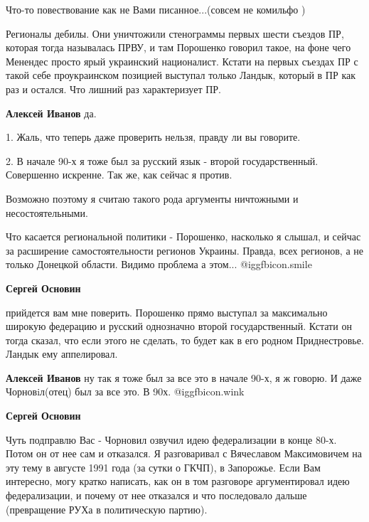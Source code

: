 \begin{itemize}
Что-то повествование как не Вами писанное...(совсем не комильфо )


Регионалы дебилы. Они уничтожили стенограммы первых шести съездов ПР, которая
тогда называлась ПРВУ, и там Порошенко говорил такое, на фоне чего Менендес
просто ярый украинский националист. Кстати на первых съездах ПР с такой себе
проукраинском позицией выступал только Ландык, который в ПР как раз и остался.
Что лишний раз характеризует ПР.

\begin{itemize} %
\textbf{Алексей Иванов} да.

1. Жаль, что теперь даже проверить нельзя, правду ли вы говорите.

2. В начале 90-х я тоже был за русский язык - второй государственный.
Совершенно искренне. Так же, как сейчас я против.

Возможно поэтому я считаю такого рода аргументы ничтожными и несостоятельными.

Что касается региональной политики - Порошенко, насколько я слышал, и сейчас за
расширение самостоятельности регионов Украины. Правда, всех регионов, а не
только Донецкой области. Видимо проблема а этом...  @igg{fbicon.smile} 

\textbf{Сергей Основин} 

прийдется вам мне поверить. Порошенко прямо выступал за максимально широкую
федерацию и русский однозначно второй государственный. Кстати он тогда сказал,
что если этого не сделать, то будет как в его родном Приднестровье. Ландык ему
аппелировал.

\textbf{Алексей Иванов} ну так я тоже был за все это в начале 90-х, я ж говорю. И даже Чорновiл(отец) был за все это. В 90х.  @igg{fbicon.wink} 

\textbf{Сергей Основин} 

Чуть подправлю Вас - Чорновил озвучил идею федерализации в конце 80-х. Потом он
от нее сам и отказался. Я разговаривал с Вячеславом Максимовичем на эту тему в
августе 1991 года (за сутки о ГКЧП), в Запорожье. Если Вам интересно, могу
кратко написать, как он в том разговоре аргументировал идею федерализации, и
почему от нее отказался и что последовало дальше (превращение РУХа в
политическую партию).

\end{itemize} %



\end{itemize}
